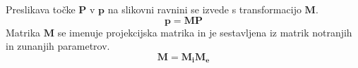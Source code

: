 Preslikava točke $\pmb{P}$ v $\pmb{p}$ na slikovni ravnini se izvede s transformacijo $\pmb{M}$.
\[
    \pmb{p} = \pmb{M P}
\]
Matrika $\pmb{M}$ se imenuje projekcijska matrika in je sestavljena iz matrik notranjih in zunanjih parametrov.
\[
    \pmb{M} = \pmb{M_i M_e}
\]
